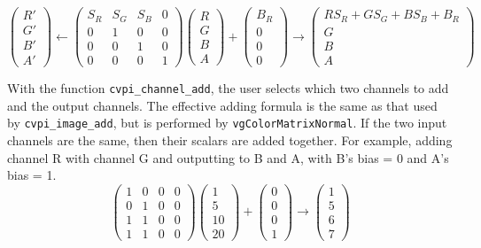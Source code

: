 \documentclass[12pt]{report}
\begin{document}
   \[
 \begin{pmatrix} R' \\ G' \\ B' \\ A' \end{pmatrix}
          \gets \begin{pmatrix} S_R & S_G & S_B &
 0 \\ 0 & 1 & 0 & 0 \\ 0 & 0 & 1 & 0 \\ 0 & 0 & 0 & 1 \end{pmatrix}
  \begin{pmatrix} R \\ G \\ B \\ A \end{pmatrix}
  + \begin{pmatrix} B_R \\ 0 \\ 0 \\ 0 \end{pmatrix} \to \begin{pmatrix} R S_R + G S_G + B S_B
  + B_R \\ G \\ B \\ A \end{pmatrix}
\]

With the function {\tt cvpi\_channel\_add}, the user selects which two
channels to add and the output channels. The effective adding formula
is the same as that used by {\tt cvpi\_image\_add}, but is performed
by {\tt vgColorMatrixNormal}. If the two input channels are the same,
then their scalars are added together.  For example, adding channel R
with channel G and outputting to B and A, with B's bias = 0 and A's
bias = 1.
   \[
 \begin{pmatrix} 1 & 0 & 0 & 0 \\ 0 & 1 & 0 & 0 \\ 1 & 1 & 0 & 0 \\ 1 & 1 & 0 & 0 \end{pmatrix}
          \begin{pmatrix} 1 \\ 5 \\ 10 \\ 20 \end{pmatrix}
          + \begin{pmatrix} 0 \\ 0 \\ 0 \\ 1 \end{pmatrix} \to \begin{pmatrix} 1 \\ 5 \\ 6 \\ 7 \end{pmatrix}
\]
\end{document}
